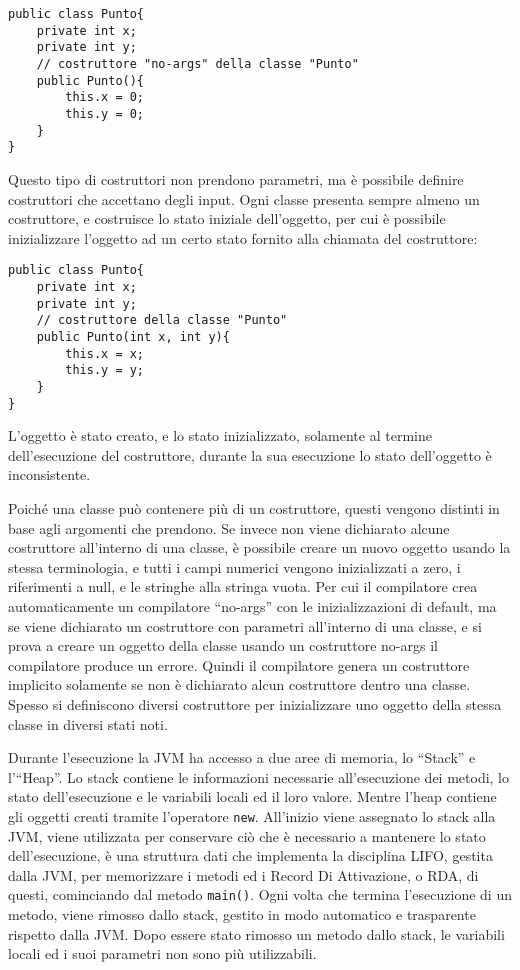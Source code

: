 \documentclass{article}
\numberwithin{equation}{subsection}
\begin{document}
\begin{verbatim}
public class Punto{
    private int x;
    private int y;
    // costruttore "no-args" della classe "Punto"
    public Punto(){
        this.x = 0;
        this.y = 0;
    }
}
\end{verbatim}
Questo tipo di costruttori non prendono parametri, ma è possibile definire costruttori che accettano degli input. Ogni classe presenta sempre almeno un costruttore, e 
costruisce lo stato iniziale dell'oggetto, per cui è possibile inizializzare l'oggetto ad un certo stato fornito alla chiamata del costruttore:
\begin{verbatim}
public class Punto{
    private int x;
    private int y;
    // costruttore della classe "Punto"
    public Punto(int x, int y){
        this.x = x;
        this.y = y;
    }
}
\end{verbatim}

L'oggetto è stato creato, e lo stato inizializzato, solamente al termine dell'esecuzione del costruttore, durante la sua esecuzione lo stato dell'oggetto è inconsistente.  

Poiché una classe può contenere più di un costruttore, questi vengono distinti in base agli argomenti che prendono. 
Se invece non viene dichiarato alcune costruttore all'interno di una classe, è possibile creare un nuovo oggetto usando la stessa terminologia, e tutti i campi numerici 
vengono inizializzati a zero, i riferimenti a null, e le stringhe alla stringa vuota. Per cui il compilatore crea automaticamente un compilatore ``no-args'' con le inizializzazioni 
di default, ma se viene dichiarato un costruttore con parametri all'interno di una classe, e si prova a creare un oggetto della classe usando un costruttore no-args il 
compilatore produce un errore. Quindi il compilatore genera un costruttore implicito solamente se non è dichiarato alcun costruttore dentro una classe. 
Spesso si definiscono diversi costruttore per inizializzare uno oggetto della stessa classe in diversi stati noti. 

Durante l'esecuzione la JVM ha accesso a due aree di memoria, lo ``Stack'' e l'``Heap''. Lo stack contiene le informazioni necessarie all'esecuzione dei metodi, lo stato dell'esecuzione e le 
variabili locali ed il loro valore. Mentre l'heap contiene gli oggetti creati tramite l'operatore \verb|new|. 
All'inizio viene assegnato lo stack alla JVM, viene utilizzata per conservare ciò che è necessario a mantenere lo stato dell'esecuzione, è una struttura dati che implementa la disciplina 
LIFO, gestita dalla JVM, per memorizzare i metodi ed i Record Di Attivazione, o RDA, di questi, cominciando dal metodo \verb|main()|. 
Ogni volta che termina l'esecuzione di un metodo, viene rimosso dallo stack, gestito in modo automatico e trasparente rispetto dalla JVM. Dopo essere stato rimosso un metodo dallo stack, 
le variabili locali ed i suoi parametri non sono più utilizzabili. 
\end{document}

